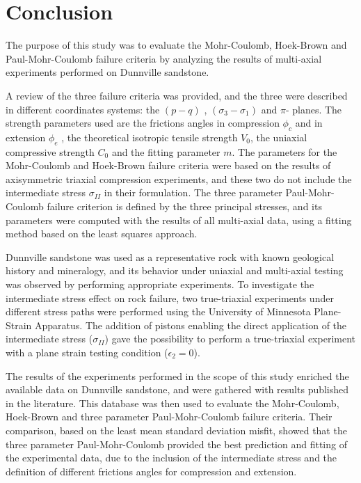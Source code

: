 \chapter{Conclusion}\label{ch6:chapter6}

The purpose of this study was to evaluate the Mohr-Coulomb, Hoek-Brown and Paul-Mohr-Coulomb failure criteria by analyzing the results of multi-axial experiments performed on Dunnville sandstone. 

A review of the three failure criteria was provided, and the three were described in different coordinates systems: the $(p-q)$ , $(\sigma_3-\sigma_1)$ and $\pi$- planes. The strength parameters used are the frictions angles in compression $\phi_c$ and in extension $\phi_e$ , the theoretical isotropic tensile strength $V_0$, the uniaxial compressive strength $C_0$ and the fitting parameter $m$. The parameters for the Mohr-Coulomb and Hoek-Brown failure criteria were based on the results of axisymmetric triaxial compression experiments, and these two  do not include the intermediate stress $\sigma_{II}$ in their formulation. The three parameter Paul-Mohr-Coulomb failure criterion is defined by the three principal stresses, and its parameters were computed with the results of all multi-axial data, using a fitting method based on the least squares approach.

Dunnville sandstone was used as a representative rock with known geological history and mineralogy, and its behavior under uniaxial and multi-axial testing was observed by performing appropriate experiments. To investigate the intermediate stress effect on rock failure, two true-triaxial experiments under different stress paths were performed using the University of Minnesota Plane-Strain Apparatus. The addition of pistons enabling the direct application of the intermediate stress ($\sigma_{II}$) gave the possibility to perform a true-triaxial experiment with a plane strain testing condition ($\epsilon_2=0$). 

The results of the experiments performed in the scope of this study enriched the available data on Dunnville sandstone, and were gathered with results published in the literature. This database was then used to evaluate the Mohr-Coulomb, Hoek-Brown and three parameter Paul-Mohr-Coulomb failure criteria. Their comparison, based on the least mean standard deviation misfit, showed that the three parameter Paul-Mohr-Coulomb provided the best prediction and fitting of the experimental data, due to the inclusion of the intermediate stress and the definition of different frictions angles for compression and extension. 


